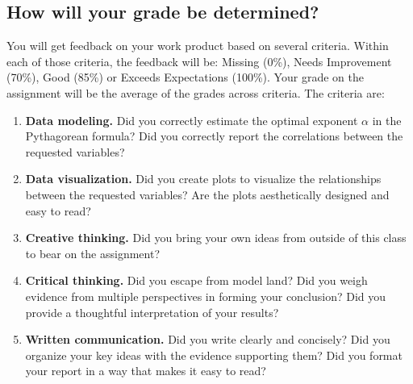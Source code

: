 \documentclass{article}
\begin{document}
    \subsection*{\sc How will your grade be determined?}

      You will get feedback on your work product based on several criteria. Within each of those criteria, the feedback will be: Missing (0\%), Needs Improvement (70\%), Good (85\%) or Exceeds Expectations (100\%). Your grade on the assignment will be the average of the grades across criteria. The criteria are:
      \begin{enumerate}
        \item {\bf Data modeling.} Did you correctly estimate the optimal exponent $\alpha$ in the Pythagorean formula? Did you correctly report the correlations between the requested variables?
        \item {\bf Data visualization.} Did you create plots to visualize the relationships between the requested variables? Are the plots aesthetically designed and easy to read?
        \item {\bf Creative thinking.} Did you bring your own ideas from outside of this class to bear on the assignment?
        \item {\bf Critical thinking.} Did you escape from model land? Did you weigh evidence from multiple perspectives in forming your conclusion? Did you provide a thoughtful interpretation of your results?
        \item {\bf Written communication.} Did you write clearly and concisely? Did you organize your key ideas with the evidence supporting them? Did you format your report in a way that makes it easy to read?
      \end{enumerate}
\end{document}
